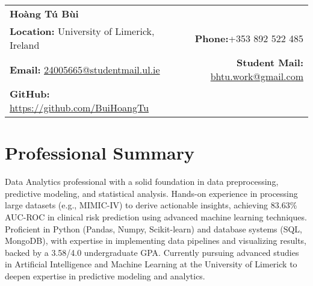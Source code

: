 \documentclass[a4paper,11pt]{article}
\makeatletter
\newcommand{\name}{Hoàng Tú Bùi} %
\newcommand{\phone}{+353 892 522 485} %
\newcommand{\emaila}{24005665@studentmail.ul.ie} %
\newcommand{\emailb}{bhtu.work@gmail.com} %
\newcommand{\github}{https://github.com/BuiHoangTu} %
\makeatother
\begin{document}
\selectfont
\parbox{2.35cm}{%


}\parbox{\dimexpr\linewidth\relax}{
\begin{tabularx}{\linewidth}{L R}
    \textbf{\LARGE \name} 
    & {}
    \\
    
    \textbf{Location:} University of Limerick, Ireland
    & \textbf{Phone:}\phone
    \\
    
    \textbf{Email:} \href{mailto:\emaila}{\emaila}
    & \textbf{Student Mail:} \href{mailto:\emailb}{\emailb}
    \\  

    \textbf{GitHub:} \href{\github}{\github} 
    & {}
    \\
    
    
\end{tabularx}
}

\vspace{-2mm}
\setlength{\tabcolsep}{5pt} %

\section{\textbf{Professional Summary}}
Data Analytics professional with a solid foundation in data preprocessing, predictive modeling, and statistical analysis. 
Hands-on experience in processing large datasets (e.g., MIMIC-IV) to derive actionable insights, achieving 83.63\% AUC-ROC in clinical risk prediction using advanced machine learning techniques. 
Proficient in Python (Pandas, Numpy, Scikit-learn) and database systems (SQL, MongoDB), with expertise in implementing data pipelines and visualizing results, backed by a 3.58/4.0 undergraduate GPA.
Currently pursuing advanced studies in Artificial Intelligence and Machine Learning at the University of Limerick to deepen expertise in predictive modeling and analytics.
\end{document}
